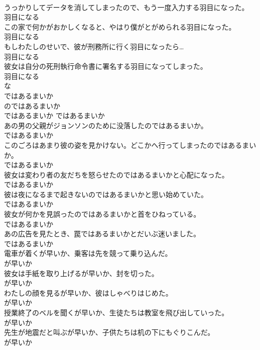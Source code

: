 \documentclass[8pt]{extreport}
\begin{document}
\begin{CJK}{UTF8}{min}
\\	うっかりしてデータを消してしまったので、もう一度入力する羽目になった。	
\\	羽目になる	
\\	この家で何かがおかしくなると、やはり僕がとがめられる羽目になった。	
\\	羽目になる	
\\	もしわたしのせいで、彼が刑務所に行く羽目になったら…	
\\	羽目になる	
\\	彼女は自分の死刑執行命令書に署名する羽目になってしまった。	
\\	羽目になる	
\\	な
\\	ではあるまいか	
\\	のではあるまいか	
\\	ではあるまいか	ではあるまいか	
\\	あの男の父親がジョンソンのために没落したのではあるまいか。	
\\	ではあるまいか	
\\	このごろはあまり彼の姿を見かけない。どこかへ行ってしまったのではあるまいか。	
\\	ではあるまいか	
\\	彼女は変わり者の友だちを怒らせたのではあるまいかと心配になった。	
\\	ではあるまいか	
\\	彼は夜になるまで起きないのではあるまいかと思い始めていた。	
\\	ではあるまいか	
\\	彼女が何かを見誤ったのではあるまいかと首をひねっている。	
\\	ではあるまいか	
\\	あの広告を見たとき、罠ではあるまいかとだいぶ迷いました。	
\\	ではあるまいか	
\\	電車が着くが早いか、乗客は先を競って乗り込んだ。	
\\	が早いか	
\\	彼女は手紙を取り上げるが早いか、封を切った。	
\\	が早いか	
\\	わたしの顔を見るが早いか、彼はしゃべりはじめた。	
\\	が早いか	
\\	授業終了のベルを聞くが早いか、生徒たちは教室を飛び出していった。	
\\	が早いか	
\\	先生が地震だと叫ぶが早いか、子供たちは机の下にもぐりこんだ。	
\\	が早いか	

\end{CJK}
\end{document}
